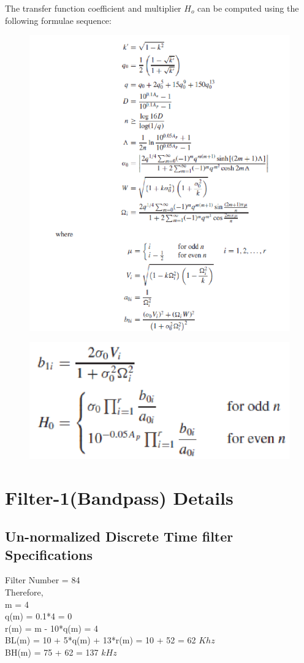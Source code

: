 \documentclass[12pt, letterpaper,]{article}
\begin{document}
\newpage
The transfer function coefficient and multiplier $H_o$ can be computed using the following formulae sequence:

\begin{figure}[!ht]
\includegraphics[width=13 cm]{Eq2.png}
\centering
\vspace{-3mm}
\end{figure}

\begin{figure}[!ht]
\includegraphics[width=5 cm]{Eq3.png}
\centering
\vspace{-3mm}
\end{figure}

\section{Filter-1(Bandpass) Details}
\subsection{Un-normalized Discrete Time filter Specifications}
Filter Number = 84\\
Therefore,\\
m = 4\\
q(m) = 0.1*4 = 0\\
r(m) = m - 10*q(m) = 4\\
BL(m) = 10 + 5*q(m) + 13*r(m) = 10 + 52 = 62 $Khz$\\
BH(m) = 75 + 62 = 137 $kHz$\\
\end{document}
